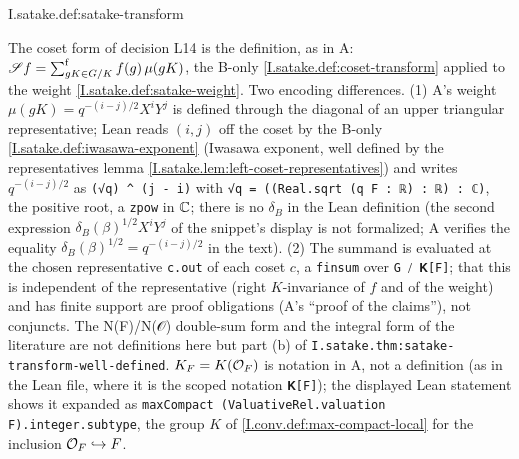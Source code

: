 \begin{definition}
\end{definition}
\begin{tfformal}{I.satake.def:satake-transform}
\begin{tffidelity}
The coset form of decision L14 is the definition, as in A: $\mathscr{S} f=\sum^{\mathrm f}_{gK\in G/K}f(g)\,\mu(gK)$, the B-only \cref{I.satake.def:coset-transform} applied to the weight \cref{I.satake.def:satake-weight}. Two encoding differences. (1) A's weight $\mu(gK)=q^{-(i-j)/2}X^iY^j$ is defined through the diagonal of an upper triangular representative; Lean reads $(i,j)$ off the coset by the B-only \cref{I.satake.def:iwasawa-exponent} (Iwasawa exponent, well defined by the representatives lemma \cref{I.satake.lem:left-coset-representatives}) and writes $q^{-(i-j)/2}$ as \texttt{(√q) \^{} (j - i)} with \texttt{√q = ((Real.sqrt (q F : ℝ) : ℝ) : ℂ)}, the positive root, a \texttt{zpow} in $\mathbb{C}$; there is no $\delta_B$ in the Lean definition (the second expression $\delta_B(\beta)^{1/2}X^iY^j$ of the snippet's display is not formalized; A verifies the equality $\delta_B(\beta)^{1/2}=q^{-(i-j)/2}$ in the text). (2) The summand is evaluated at the chosen representative \texttt{c.out} of each coset $c$, a \texttt{finsum} over \texttt{G ⧸ 𝐊[F]}; that this is independent of the representative (right $K$-invariance of $f$ and of the weight) and has finite support are proof obligations (A's ``proof of the claims''), not conjuncts. The N(F)/N(𝒪) double-sum form and the integral form of the literature are not definitions here but part (b) of \texttt{I.satake.thm:satake-transform-well-defined}. $K_F=K(\mathcal{O}_F)$ is notation in A, not a definition (as in the Lean file, where it is the scoped notation \texttt{𝐊[F]}); the displayed Lean statement shows it expanded as \texttt{maxCompact (ValuativeRel.valuation F).integer.subtype}, the group $K$ of \cref{I.conv.def:max-compact-local} for the inclusion $\mathcal{O}_F\hookrightarrow F$.
\end{tffidelity}
\end{tfformal}

